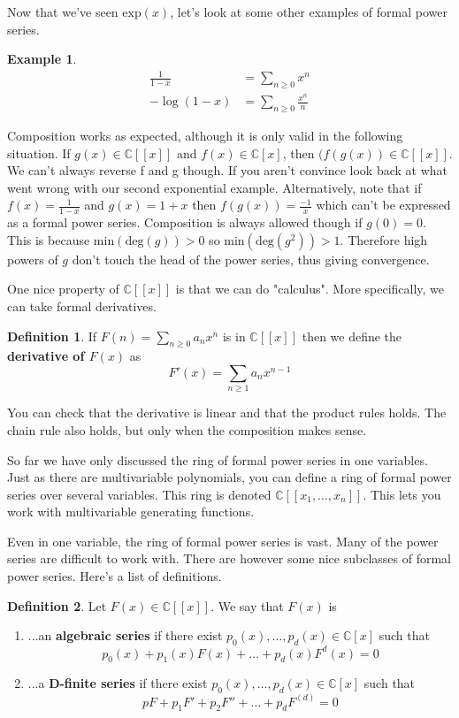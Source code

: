 \documentclass{article}
\theoremstyle{definition}
\newtheorem{example}{Example}
\newtheorem{definition}{Definition}
\begin{document}
Now that we've seen $\text{exp}(x)$, let's look at some other examples of formal power series.
\begin{example}\begin{align*}
\frac{1}{1-x} &= \sum_{n\geq 0}{x^n} \\
-\log(1-x) &= \sum_{n\geq 0}{\frac{x^n}{n}}
\end{align*}
\end{example}
Composition works as expected, although it is only valid in the following situation. If $g(x) \in \mathbb{C}[[x]]$ and $f(x) \in \mathbb{C}[x]$, then $(f(g(x)) \in \mathbb{C}[[x]]$. We can't always reverse f and g though. If you aren't convince look back at what went wrong with our second exponential example. Alternatively, note that if $f(x) = \frac{1}{1-x}$ and $g(x) = 1+x$ then $f(g(x)) = \frac{-1}{x}$ which can't be expressed as a formal power series. Composition is always allowed though if $g(0) = 0$. This is because $\text{min}(\text{deg}(g)) > 0$ so $\text{min}(\text{deg}(g^2)) > 1$. Therefore high powers of $g$ don't touch the head of the power series, thus giving convergence. 

One nice property of $\mathbb{C}[[x]]$ is that we can do "calculus". More specifically, we can take formal derivatives. 
\begin{definition} If $F(n) = \sum_{n\geq 0}a_nx^n$ is in $\mathbb{C}[[x]]$ then we define the \textbf{derivative of $F(x)$} as 
\[F'(x) = \sum_{n\geq 1}{a_nx^{n-1}}\]
\end{definition}
You can check that the derivative is linear and that the product rules holds. The chain rule also holds, but only when the composition makes sense. 

So far we have only discussed the ring of formal power series in one variables. Just as there are multivariable polynomials, you can define a ring of formal power series over several variables. This ring is denoted $\mathbb{C}[[x_1,\dots, x_n]]$. This lets you work with multivariable generating functions. 

Even in one variable, the ring of formal power series is vast. Many of the power series are difficult to work with. There are however some nice subclasses of formal power series. Here's a list of definitions.
\begin{definition} Let $F(x) \in \mathbb{C}[[x]]$. We say that $F(x)$ is 
\begin{enumerate}
	\item ...an \textbf{algebraic series} if there exist $p_0(x),\dots,p_d(x) \in \mathbb{C}[x]$ such that 
	\[p_0(x) + p_1(x)F(x) + \dots + p_d(x)F^d(x) = 0\]
	\item ...a \textbf{D-finite series} if there exist $p_0(x),\dots,p_d(x) \in \mathbb{C}[x]$ such that 
	\[pF + p_1F' + p_2F'' + \dots + p_dF^{(d)} = 0\]
	
\end{enumerate}
\end{definition}
\end{document}
